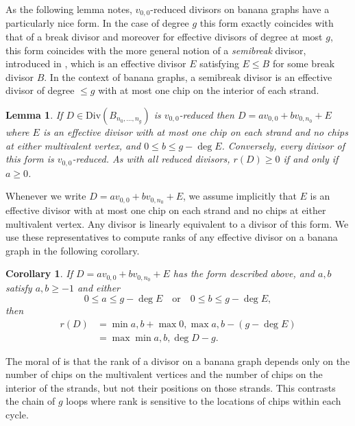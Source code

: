 \documentclass[11pt]{article}
\newtheorem{lemma}[theo]{Lemma}
\newtheorem{coro}[theo]{Corollary}
\theoremstyle{definition}
\numberwithin{equation}{section}
\newcommand{\opdiv}[1]{\mathrm{Div}\left({#1}\right)}
\begin{document}
As the following lemma notes, $v_{0,0}$-reduced divisors on banana graphs have a particularly nice form. In the case of degree $g$ this form exactly coincides with that of a break divisor and moreover for effective divisors of degree at most $g$, this form coincides with the more general notion of a \textit{semibreak} divisor, introduced in \cite{GSTSemibreak}, which is an effective divisor $E$ satisfying $E\leq B$ for some break divisor $B$. In the context of banana graphs, a semibreak divisor is an effective divisor of degree $\leq g$ with at most one chip on the interior of each strand.

\begin{lemma}
    If $D \in \opdiv{B_{n_0,\dots,n_g}}$ is $v_{0,0}$-reduced then $D = av_{0,0} + bv_{0,n_0} + E$ where $E$ is an effective divisor with at most one chip on each strand and no chips at either multivalent vertex, and $0\leq b \leq g - \deg E$. Conversely, every divisor of this form is $v_{0,0}$-reduced. As with all reduced divisors, $r(D)\geq 0$ if and only if $a\geq 0$.
\end{lemma}

 Whenever we write $D = av_{0,0} + bv_{0,n_0} + E$, we assume implicitly that $E$ is an effective divisor with at most one chip on each strand and no chips at either multivalent vertex. Any divisor is linearly equivalent to a divisor of this form.
 We use these representatives to compute ranks of any effective divisor on a banana graph in the following corollary.

\begin{coro}\label{cor-BanaRankComp}
    If $D = av_{0,0} + bv_{0,n_0} + E$ has the form described above, and $a,b$ satisfy $a,b \geq -1$ and either
    \[ 0 \leq a \leq g - \deg E \quad\mbox{or} \quad 0 \leq b \leq g - \deg E,\]
    then
    \begin{align*}
        r(D) &= \min{a,b} + \max{0,\max{a,b}-(g-\deg E)}\\
            &= \max{ \min{a,b}, \deg D - g }.
    \end{align*}
\end{coro}

The moral of  is that the rank of a divisor on a banana graph depends only on the number of chips on the multivalent vertices and the number of chips on the interior of the strands, but not their positions on those strands. This contrasts the chain of $g$ loops where rank is sensitive to the locations of chips within each cycle.
\end{document}
